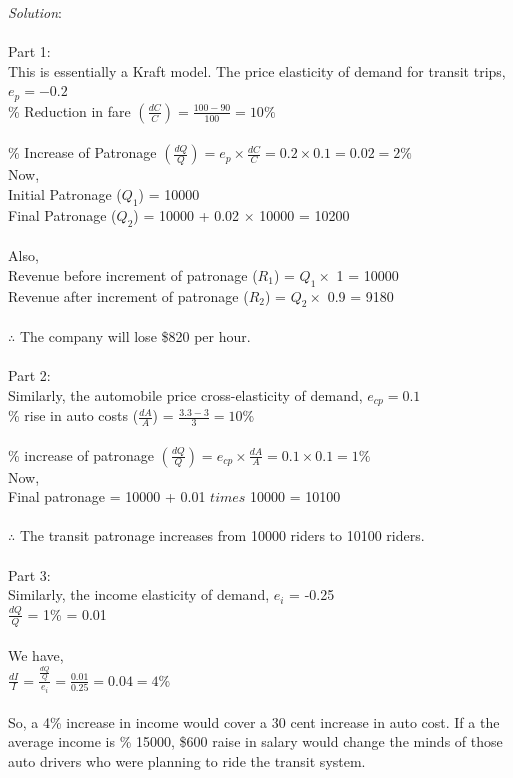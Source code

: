 \textit{Solution}:\\\\
Part 1:\\
This is essentially a Kraft model. The price elasticity of demand for transit trips,\\
$e_p = -0.2$\\
\% Reduction in fare $(\frac{dC}{C}) = \frac{100 - 90}{100} = 10\%$\\\\
\% Increase of Patronage $(\frac{dQ}{Q}) = e_p \times \frac{dC}{C} = 0.2 \times 0.1 = 0.02 = 2\%$\\
Now,\\
Initial Patronage ($Q_1$) = 10000\\
Final Patronage ($ Q_2 $) = 10000 + 0.02 $\times$ 10000 = 10200\\\\
Also,\\
Revenue before increment of patronage ($R_1$) = $Q_1 \times$ 1 = 10000\\
Revenue after increment of patronage ($R_2$) = $Q_2 \times$ 0.9 = 9180\\\\
$\therefore$ The company will lose \$820 per hour.\\\\
Part 2:\\
Similarly, the automobile price cross-elasticity of demand,
$e_{cp} = 0.1$\\
\% rise in auto costs ($\frac{dA}{A}$) = $\frac{3.3 - 3}{3} = 10\%$\\\\
\% increase of patronage $(\frac{dQ}{Q}) = e_{cp} \times \frac{dA}{A} = 0.1 \times 0.1 = 1\% $\\
Now,\\
Final patronage = 10000 + 0.01 $times$ 10000 = 10100\\\\
$\therefore$ The transit patronage increases from 10000 riders to 10100 riders.\\\\
Part 3:\\
Similarly, the income elasticity of demand,
$e_i$ = -0.25\\
$\frac{dQ}{Q}$ = 1\% = 0.01\\\\
We have,\\
$\frac{dI}{I} = \frac{\frac{dQ}{Q}}{e_i} = \frac{0.01}{0.25} = 0.04 = 4\%$\\\\
So, a 4\% increase in income would cover a 30 cent increase in auto cost. If a the average income is \% 15000, \$600 raise in salary would change the minds of those auto drivers who were planning to ride the transit system.
